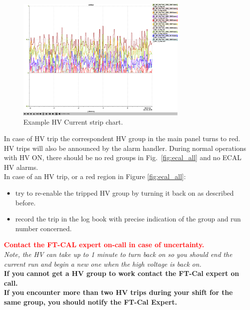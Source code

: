 \documentclass[11.5pt]{article}
\begin{document}
  \begin{figure}[htbp]\centering
       \includegraphics[width=8.4cm]{pics/HV_I_Strip_Chart.png}
       \caption{Example HV Current strip chart.\label{fig:hvcurrentstrips}}
  \end{figure}
In case of HV trip the correspondent HV group in the main panel turns to red. HV trips will also be announced by the alarm handler.  During normal operations with HV ON, there should be no red groups in Fig.~\ref{fig:ecal_all} and no ECAL HV alarms.\\  
In case of an HV trip, or a red region in Figure \ref{fig:ecal_all}:
\begin{itemize}
    \item try to re-enable the tripped HV group by turning it back on as described before.
    \item record the trip in the log book with precise indication of the group and run
        number concerned.
\end{itemize}
\textcolor{red}{\textbf{Contact the FT-CAL expert on-call in case of uncertainty.}}\\
 {\em Note, the HV can take up to 1 minute to turn back on so you should end the current run and begin a new one when the high voltage is back on.} \\ 
 \textbf{If you cannot get a HV group to work contact the FT-Cal expert on call.}\\
 {\bf If you encounter more than two HV trips during your shift for the same group, you should notify the FT-Cal Expert.}
\end{document}
